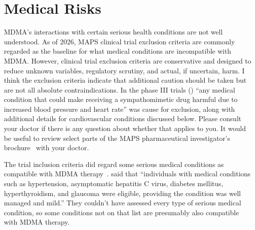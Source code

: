 \documentclass[11pt,oneside]{book}
\let\cite\parencite
\begin{document}
\section{Medical Risks}
\label{medical}
MDMA's interactions with certain serious health conditions are not well understood. As of 2026, MAPS clinical trial exclusion criteria are commonly regarded as the baseline for what medical conditions are incompatible with MDMA. However, clinical trial exclusion criteria are conservative and designed to reduce unknown variables, regulatory scrutiny, and actual, if uncertain, harm. I think the exclusion criteria indicate that additional caution should be taken but are not all absolute contraindications. In the phase III trials (\textcite[Supplementary Information; p. 5]{mitchellMDMAClinicalTrial2}) \enquote{any medical condition that could make receiving a sympathomimetic drug harmful due to increased blood pressure and heart rate} was cause for exclusion, along with additional details for cardiovascular conditions discussed below. Please consult your doctor if there is any question about whether that applies to you. It would be useful to review select parts of the MAPS pharmaceutical investigator's brochure~\cite{mapsInvestigatorBrochure} with your doctor.

The trial inclusion criteria did regard some serious medical conditions as compatible with MDMA therapy~\cite{mitchellMDMAClinicalTrial2}. \textcite[Supplementary Information; p. 5]{mitchellMDMAClinicalTrial2} said that \enquote{individuals with medical conditions such as hypertension, asymptomatic hepatitis C virus, diabetes mellitus, hyperthyroidism, and glaucoma were eligible, providing the condition was well managed and mild.} They couldn't have assessed every type of serious medical condition, so some conditions not on that list are presumably also compatible with MDMA therapy.
\end{document}
